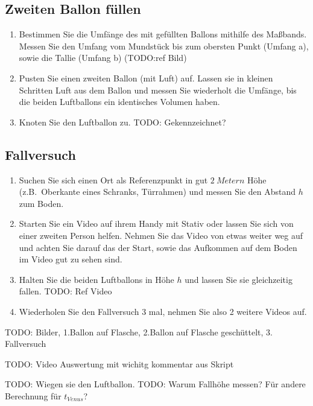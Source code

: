 \documentclass{article}
\begin{document}
        \subsection{Zweiten Ballon füllen}
            \begin{enumerate}[resume]
                \item Bestimmen Sie die Umfänge des mit  gefüllten Ballons mithilfe des Maßbands.
                Messen Sie den Umfang vom Mundstück bis zum obersten Punkt (Umfang a), sowie die \glqq{}Tallie\grqq{} (Umfang b) (TODO:ref Bild)
                \item Pusten Sie einen zweiten Ballon (mit Luft) auf. Lassen sie in kleinen Schritten Luft aus dem Ballon und messen Sie wiederholt die Umfänge,
                bis die beiden Luftballons ein identisches Volumen haben.
                \item Knoten Sie den Luftballon zu.
                TODO: Gekennzeichnet?
            \end{enumerate}
        
        \subsection{Fallversuch}
            \begin{enumerate}[resume]
                \item Suchen Sie sich einen Ort als Referenzpunkt in gut \(\SI{2}{Metern}\) Höhe (z.B.\ Oberkante eines Schranks, Türrahmen) und messen Sie
                den Abstand \(h\) zum Boden.
                \item Starten Sie ein Video auf ihrem Handy mit Stativ oder lassen Sie sich von einer zweiten Person helfen.
                Nehmen Sie das Video von etwas weiter weg auf und achten Sie darauf das der Start, sowie das Aufkommen auf dem Boden im Video gut zu sehen sind.
                \item Halten Sie die beiden Luftballons in Höhe \(h\) und lassen Sie sie gleichzeitig fallen. TODO: Ref Video
                \item Wiederholen Sie den Fallversuch 3 mal, nehmen Sie also 2 weitere Videos auf.
            \end{enumerate}    
        TODO: Bilder, 1.Ballon auf Flasche, 2.Ballon auf Flasche geschüttelt, 3. Fallversuch
        
    TODO: Video Auswertung mit wichitg kommentar aus Skript

    TODO: Wiegen sie den Luftballon.
    TODO: Warum Fallhöhe messen? Für andere Berechnung für \(t_{Venus}\)?
\end{document}
